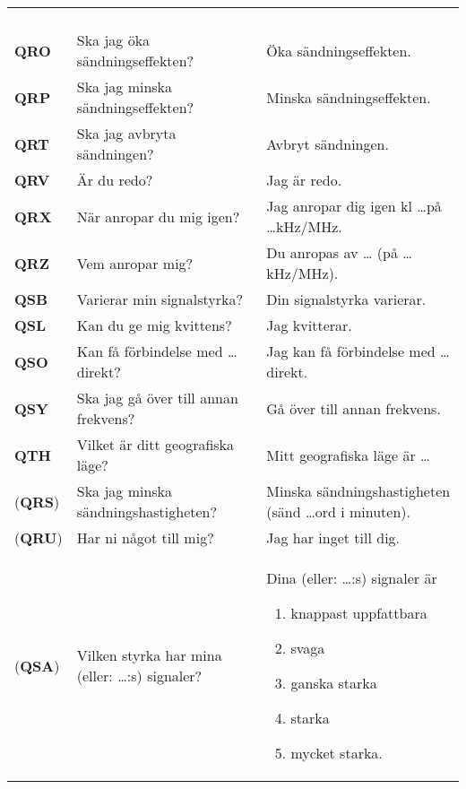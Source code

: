 \begin{table*}
\begin{threeparttable}
\begin{tabular}{lp{6cm}p{6cm}}
\begin{enumerate}[noitemsep]
                   \end{enumerate} \\
    \textbf{QRO} & Ska jag öka sändningseffekten? & Öka sändningseffekten. \\
    \textbf{QRP} & Ska jag minska sändningseffekten? & Minska sändningseffekten. \\
    \textbf{QRT} & Ska jag avbryta sändningen? & Avbryt sändningen. \\
    \textbf{QRV} & Är du redo? & Jag är redo. \\
    \textbf{QRX} & När anropar du mig igen? & Jag anropar dig igen kl \dots på \dots kHz/MHz.\\
    \textbf{QRZ} & Vem anropar mig? & Du anropas av \dots\tnote{*} (på \dots kHz/MHz). \\
    \textbf{QSB} & Varierar min signalstyrka? & Din signalstyrka varierar. \\
    \textbf{QSL} & Kan du ge mig kvittens? & Jag kvitterar. \\
    \textbf{QSO} & Kan få förbindelse med \dots \tnote{*} direkt? &
                   Jag kan få förbindelse med \dots \tnote{*} direkt. \\
    \textbf{QSY} & Ska jag gå över till annan frekvens? & Gå över till annan frekvens. \\
    \textbf{QTH} & Vilket är ditt geografiska läge? & Mitt geografiska läge är \dots \\
    (\textbf{QRS}) & Ska jag minska sändningshastigheten? & Minska sändningshastigheten
                                                            (sänd \dots ord i minuten). \\
    (\textbf{QRU}) & Har ni något till mig? & Jag har inget till dig. \\
    (\textbf{QSA}) & Vilken styrka har mina (eller: \dots:s)\tnote{*} signaler?
                   & Dina (eller: \dots:s)\tnote{*} signaler är
                     \vspace{-\topsep}
                     \begin{enumerate}[noitemsep]
     	                 \item knappast uppfattbara
    	                 \item svaga
    	                 \item ganska starka
    	                 \item starka
    	                 \item mycket starka.
                     \end{enumerate} \\

\end{tabular}
\end{threeparttable}
\end{table*}
